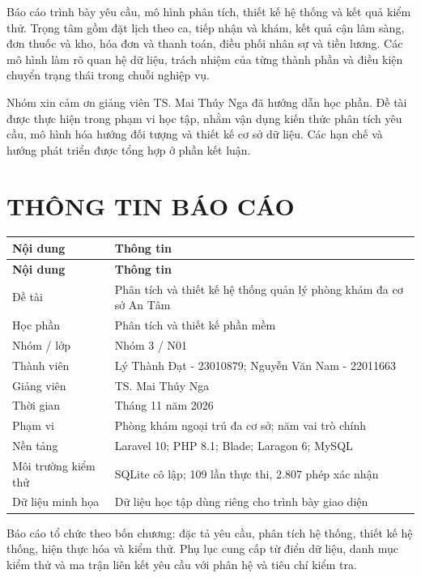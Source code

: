 Báo cáo trình bày yêu cầu, mô hình phân tích, thiết kế hệ thống và kết quả kiểm thử.\allowbreak{} Trọng tâm gồm đặt lịch theo ca, tiếp nhận và khám, kết quả cận lâm sàng, đơn thuốc và kho, hóa đơn và thanh toán, điều phối nhân sự và tiền lương.\allowbreak{} Các mô hình làm rõ quan hệ dữ liệu, trách nhiệm của từng thành phần và điều kiện chuyển trạng thái trong chuỗi nghiệp vụ.\allowbreak{}

Nhóm xin cảm ơn giảng viên TS.\allowbreak{} Mai Thúy Nga đã hướng dẫn học phần.\allowbreak{} Đề tài được thực hiện trong phạm vi học tập, nhằm vận dụng kiến thức phân tích yêu cầu, mô hình hóa hướng đối tượng và thiết kế cơ sở dữ liệu.\allowbreak{} Các hạn chế và hướng phát triển được tổng hợp ở phần kết luận.\allowbreak{}

\clearpage
\chapter*{THÔNG TIN BÁO CÁO}

{\small\setlength{\tabcolsep}{3pt}\renewcommand{\arraystretch}{1.12}
\begin{longtable}{@{}L{\textwidth-1.5pt\relax} L{\textwidth-4.5pt\relax}@{}}
\toprule
\textbf{Nội dung} & \textbf{Thông tin}\\\midrule
\endfirsthead
\toprule
\textbf{Nội dung} & \textbf{Thông tin}\\\midrule
\endhead
\bottomrule\endlastfoot
Đề tài & Phân tích và thiết kế hệ thống quản lý phòng khám đa cơ sở An Tâm\\[3pt]
Học phần & Phân tích và thiết kế phần mềm\\[3pt]
Nhóm /\allowbreak{} lớp & Nhóm 3 /\allowbreak{} N01\\[3pt]
Thành viên & Lý Thành Đạt - 23010879; Nguyễn Văn Nam - 22011663\\[3pt]
Giảng viên & TS.\allowbreak{} Mai Thúy Nga\\[3pt]
Thời gian & Tháng 11 năm 2026\\[3pt]
Phạm vi & Phòng khám ngoại trú đa cơ sở; năm vai trò chính\\[3pt]
Nền tảng & Laravel 10; PHP 8.\allowbreak{}1; Blade; Laragon 6; My\allowbreak{}SQL\\[3pt]
Môi trường kiểm thử & SQLite cô lập; 109 lần thực thi, 2.\allowbreak{}807 phép xác nhận\\[3pt]
Dữ liệu minh họa & Dữ liệu học tập dùng riêng cho trình bày giao diện\\[3pt]
\end{longtable}}
Báo cáo tổ chức theo bốn chương:\allowbreak{} đặc tả yêu cầu, phân tích hệ thống, thiết kế hệ thống, hiện thực hóa và kiểm thử.\allowbreak{} Phụ lục cung cấp từ điển dữ liệu, danh mục kiểm thử và ma trận liên kết yêu cầu với phân hệ và tiêu chí kiểm tra.\allowbreak{}

